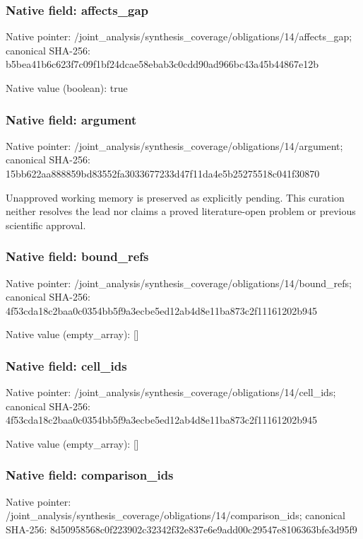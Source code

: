 \documentclass[10pt,a4paper]{article}
\begin{document}
\subsubsection{Native field: affects\_\allowbreak{}gap}
Native pointer: /joint\_\allowbreak{}analysis/synthesis\_\allowbreak{}coverage/obligations/14/affects\_\allowbreak{}gap; canonical SHA-256: b5bea41b6c623f7c09f1bf24dcae58ebab3c0cdd90ad966bc43a45b44867e12b

Native value (boolean): true

\subsubsection{Native field: argument}
Native pointer: /joint\_\allowbreak{}analysis/synthesis\_\allowbreak{}coverage/obligations/14/argument; canonical SHA-256: 15bb622aa888859bd83552fa3033677233d47f11da4e5b25275518c041f30870

\begingroup\raggedright\sloppy Unapproved working memory is preserved as explicitly pending. This curation neither resolves the lead nor claims a proved literature-open problem or previous scientific approval.\par\endgroup

\subsubsection{Native field: bound\_\allowbreak{}refs}
Native pointer: /joint\_\allowbreak{}analysis/synthesis\_\allowbreak{}coverage/obligations/14/bound\_\allowbreak{}refs; canonical SHA-256: 4f53cda18c2baa0c0354bb5f9a3ecbe5ed12ab4d8e11ba873c2f11161202b945

Native value (empty\_\allowbreak{}array): []

\subsubsection{Native field: cell\_\allowbreak{}ids}
Native pointer: /joint\_\allowbreak{}analysis/synthesis\_\allowbreak{}coverage/obligations/14/cell\_\allowbreak{}ids; canonical SHA-256: 4f53cda18c2baa0c0354bb5f9a3ecbe5ed12ab4d8e11ba873c2f11161202b945

Native value (empty\_\allowbreak{}array): []

\subsubsection{Native field: comparison\_\allowbreak{}ids}
Native pointer: /joint\_\allowbreak{}analysis/synthesis\_\allowbreak{}coverage/obligations/14/comparison\_\allowbreak{}ids; canonical SHA-256: 8d50958568c0f223902c32342f32e837e6e9add00c29547e8106363bfe3d95f9
\end{document}
